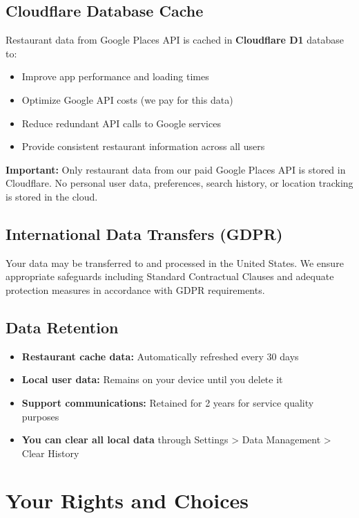 \documentclass[11pt,letterpaper]{article}
\begin{document}
\subsection{Cloudflare Database Cache}
Restaurant data from Google Places API is cached in \textbf{Cloudflare D1} database to:
\begin{itemize}
    \item Improve app performance and loading times
    \item Optimize Google API costs (we pay for this data)
    \item Reduce redundant API calls to Google services
    \item Provide consistent restaurant information across all users
\end{itemize}

\textbf{Important:} Only restaurant data from our paid Google Places API is stored in Cloudflare. No personal user data, preferences, search history, or location tracking is stored in the cloud.

\subsection{International Data Transfers (GDPR)}
Your data may be transferred to and processed in the United States. We ensure appropriate safeguards including Standard Contractual Clauses and adequate protection measures in accordance with GDPR requirements.

\subsection{Data Retention}
\begin{itemize}
    \item \textbf{Restaurant cache data:} Automatically refreshed every 30 days
    \item \textbf{Local user data:} Remains on your device until you delete it
    \item \textbf{Support communications:} Retained for 2 years for service quality purposes
    \item \textbf{You can clear all local data} through Settings > Data Management > Clear History
\end{itemize}

\section{Your Rights and Choices}
\end{document}
